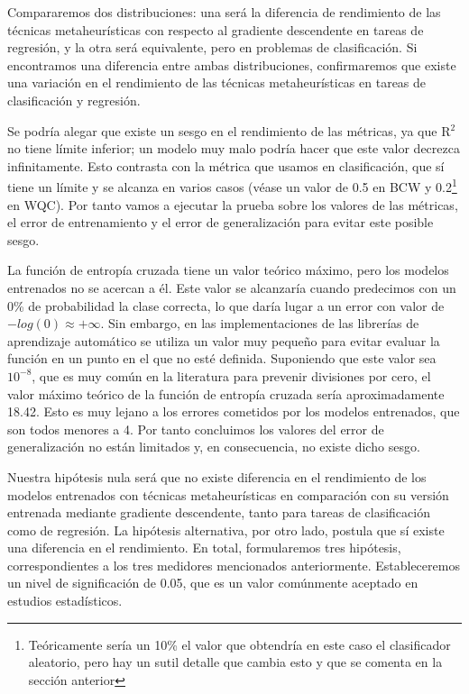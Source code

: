 Compararemos dos distribuciones: una será la diferencia de rendimiento de las técnicas metaheurísticas con respecto al gradiente descendente en tareas de regresión, y la otra será equivalente, pero en problemas de clasificación. Si encontramos una diferencia entre ambas distribuciones, confirmaremos que existe una variación en el rendimiento de las técnicas metaheurísticas en tareas de clasificación y regresión.


Se podría alegar que existe un sesgo en el rendimiento de las métricas, ya que R$^2$ no tiene límite inferior; un modelo muy malo podría hacer que este valor decrezca infinitamente. Esto contrasta con la métrica que usamos en clasificación, que sí tiene un límite y se alcanza en varios casos (véase un valor de 0.5 en BCW y 0.2\footnote{Teóricamente sería un 10\% el valor que obtendría en este caso el clasificador aleatorio, pero hay un sutil detalle que cambia esto y que se comenta en la sección anterior} en WQC). Por tanto vamos a ejecutar la prueba sobre los valores de las métricas, el error de entrenamiento y el error de generalización para evitar este posible sesgo.

La función de entropía cruzada tiene un valor teórico máximo, pero los modelos entrenados no se acercan a él. Este valor se alcanzaría cuando predecimos con un 0\% de probabilidad la clase correcta, lo que daría lugar a un error con valor de $-log(0) \approx + \infty$. Sin embargo, en las implementaciones de las librerías de aprendizaje automático se utiliza un valor muy pequeño para evitar evaluar la función en un punto en el que no esté definida. Suponiendo que este valor sea $10^{-8}$, que es muy común en la literatura para prevenir divisiones por cero, el valor máximo teórico de la función de entropía cruzada sería aproximadamente 18.42. Esto es muy lejano a los errores cometidos por los modelos entrenados, que son todos menores a 4. Por tanto concluimos los valores del error de generalización no están limitados y, en consecuencia, no existe dicho sesgo.


Nuestra hipótesis nula será que no existe diferencia en el rendimiento de los modelos entrenados con técnicas metaheurísticas en comparación con su versión entrenada mediante gradiente descendente, tanto para tareas de clasificación como de regresión. La hipótesis alternativa, por otro lado, postula que sí existe una diferencia en el rendimiento. En total, formularemos tres hipótesis, correspondientes a los tres medidores mencionados anteriormente. Estableceremos un nivel de significación de 0.05, que es un valor comúnmente aceptado en estudios estadísticos.

